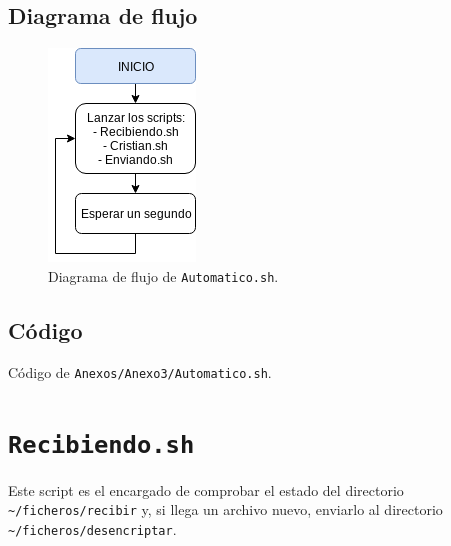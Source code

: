 \subsection{Diagrama de flujo}
\begin{figure}[h]
	\centering
	\includegraphics[scale=0.9]{Anexos/Anexo3/Diagramas/Automatico.png}
	\caption{Diagrama de flujo de \texttt{Automatico.sh}.}
	\label{Diagrama de flujo de Automatico.sh}
\end{figure}

\subsection{Código}

\begin{center}
	Código de \texttt{Anexos/Anexo3/Automatico.sh}.
\end{center}


\newpage
\section{\texttt{Recibiendo.sh}}
\hypertarget{ScriptRecibiendo}{}
Este script es el encargado de comprobar el estado del directorio \texttt{\textasciitilde/ficheros/recibir} y, si llega un archivo nuevo, enviarlo al directorio \texttt{\textasciitilde/ficheros/desencriptar}.


